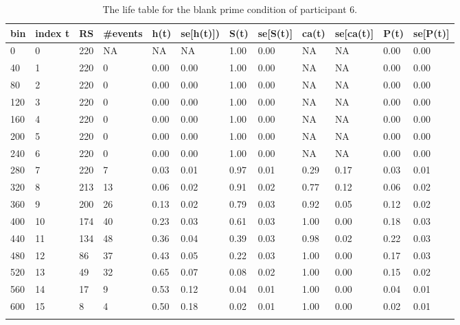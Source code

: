 \documentclass[
  english,
  man, donotrepeattitle,floatsintext]{apa6}
\begin{document}
\begin{table}[H]

\begin{center}
\begin{threeparttable}

\caption{\label{tab:life-table}The life table for the blank prime condition of participant 6.}

\begin{tabular}{llllllllllll}
\toprule
bin & \multicolumn{1}{c}{index t} & \multicolumn{1}{c}{RS} & \multicolumn{1}{c}{\#events} & \multicolumn{1}{c}{h(t)} & \multicolumn{1}{c}{se[h(t)])} & \multicolumn{1}{c}{S(t)} & \multicolumn{1}{c}{se[S(t)]} & \multicolumn{1}{c}{ca(t)} & \multicolumn{1}{c}{se[ca(t)]} & \multicolumn{1}{c}{P(t)} & \multicolumn{1}{c}{se[P(t)]}\\
\midrule
0 & 0 & 220 & NA & NA & NA & 1.00 & 0.00 & NA & NA & 0.00 & 0.00\\
40 & 1 & 220 & 0 & 0.00 & 0.00 & 1.00 & 0.00 & NA & NA & 0.00 & 0.00\\
80 & 2 & 220 & 0 & 0.00 & 0.00 & 1.00 & 0.00 & NA & NA & 0.00 & 0.00\\
120 & 3 & 220 & 0 & 0.00 & 0.00 & 1.00 & 0.00 & NA & NA & 0.00 & 0.00\\
160 & 4 & 220 & 0 & 0.00 & 0.00 & 1.00 & 0.00 & NA & NA & 0.00 & 0.00\\
200 & 5 & 220 & 0 & 0.00 & 0.00 & 1.00 & 0.00 & NA & NA & 0.00 & 0.00\\
240 & 6 & 220 & 0 & 0.00 & 0.00 & 1.00 & 0.00 & NA & NA & 0.00 & 0.00\\
280 & 7 & 220 & 7 & 0.03 & 0.01 & 0.97 & 0.01 & 0.29 & 0.17 & 0.03 & 0.01\\
320 & 8 & 213 & 13 & 0.06 & 0.02 & 0.91 & 0.02 & 0.77 & 0.12 & 0.06 & 0.02\\
360 & 9 & 200 & 26 & 0.13 & 0.02 & 0.79 & 0.03 & 0.92 & 0.05 & 0.12 & 0.02\\
400 & 10 & 174 & 40 & 0.23 & 0.03 & 0.61 & 0.03 & 1.00 & 0.00 & 0.18 & 0.03\\
440 & 11 & 134 & 48 & 0.36 & 0.04 & 0.39 & 0.03 & 0.98 & 0.02 & 0.22 & 0.03\\
480 & 12 & 86 & 37 & 0.43 & 0.05 & 0.22 & 0.03 & 1.00 & 0.00 & 0.17 & 0.03\\
520 & 13 & 49 & 32 & 0.65 & 0.07 & 0.08 & 0.02 & 1.00 & 0.00 & 0.15 & 0.02\\
560 & 14 & 17 & 9 & 0.53 & 0.12 & 0.04 & 0.01 & 1.00 & 0.00 & 0.04 & 0.01\\
600 & 15 & 8 & 4 & 0.50 & 0.18 & 0.02 & 0.01 & 1.00 & 0.00 & 0.02 & 0.01\\
\bottomrule
\addlinespace
\end{tabular}


\end{threeparttable}
\end{center}
\end{table}
\end{document}
